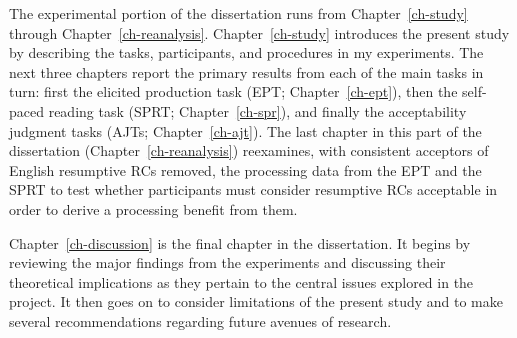 The experimental portion of the dissertation runs from Chapter~\ref{ch-study} through Chapter~\ref{ch-reanalysis}. Chapter~\ref{ch-study} introduces the present study by describing the tasks, participants, and procedures in my experiments. The next three chapters report the primary results from each of the main tasks in turn: first the elicited production task (EPT; Chapter~\ref{ch-ept}), then the self-paced reading task (SPRT; Chapter~\ref{ch-spr}), and finally the acceptability judgment tasks (AJTs; Chapter~\ref{ch-ajt}). The last chapter in this part of the dissertation (Chapter~\ref{ch-reanalysis}) reexamines, with consistent acceptors of English resumptive RCs removed, the processing data from the EPT and the SPRT to test whether participants must consider resumptive RCs acceptable in order to derive a processing benefit from them.

Chapter~\ref{ch-discussion} is the final chapter in the dissertation. It begins by reviewing the major findings from the experiments and discussing their theoretical implications as they pertain to the central issues explored in the project. It then goes on to consider limitations of the present study and to make several recommendations regarding future avenues of research.